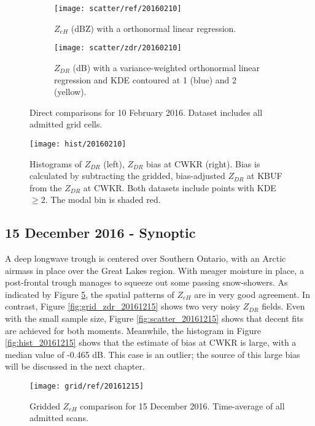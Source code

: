 \begin{figure}[H]
\centering
   \begin{subfigure}[t]{0.48\linewidth} \centering
     \texttt{[image: scatter/ref/20160210]}
     \caption{$Z_{eH}$ (dBZ) with a orthonormal linear regression.}\label{fig:scatter_ref_20160210}
   \end{subfigure}
   \begin{subfigure}[t]{0.48\linewidth} \centering
     \texttt{[image: scatter/zdr/20160210]}
     \caption{$Z_{DR}$ (dB) with a variance-weighted orthonormal linear regression and KDE contoured at 1 (blue) and 2 (yellow).}\label{fig:scatter_zdr_20160210}
   \end{subfigure}
\caption{Direct comparisons for 10 February 2016. Dataset includes all admitted grid cells.} \label{fig:scatter_20160210}
\end{figure}

\begin{figure}[H]
\texttt{[image: hist/20160210]}\centering
\caption{Histograms of $Z_{DR}$ (left), $Z_{DR}$ bias at CWKR (right). Bias is calculated by subtracting the gridded, bias-adjusted $Z_{DR}$ at KBUF from the
$Z_{DR}$ at CWKR. Both datasets include points with KDE $\geq 2$. The modal bin is shaded red.} 
\label{fig:hist_20160210}
\end{figure}

\subsection{15 December 2016 - Synoptic}
A deep longwave trough is centered over Southern Ontario, with an Arctic airmass in place over the Great Lakes region. With meager moisture in place, a
post-frontal trough manages to squeeze out some passing snow-showers. As indicated by Figure \ref{fig:grid_ref_20161215}, the spatial patterns of $Z_{eH}$ are in very good agreement. In contrast, Figure \ref{fig:grid_zdr_20161215} shows two very noisy $Z_{DR}$ fields. Even with the small sample size, Figure \ref{fig:scatter_20161215} shows that decent fits are achieved for both moments. Meanwhile, the histogram in Figure \ref{fig:hist_20161215} shows that the estimate of bias at CWKR is large, with a median value of -0.465 dB. This case is an outlier; the source of this large bias will be discussed in the next chapter. 
\begin{figure}[p]
\texttt{[image: grid/ref/20161215]}
\caption{Gridded $Z_{eH}$ comparison for 15 December 2016. Time-average of all admitted scans.} 
\label{fig:grid_ref_20161215}
\end{figure}

